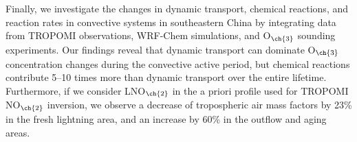 {Finally, we investigate the changes in dynamic transport, chemical reactions, and reaction rates in convective systems in southeastern China by integrating data from TROPOMI observations, WRF-Chem simulations, and O$_{\ch{3}}$ sounding experiments.
Our findings reveal that dynamic transport can dominate O$_{\ch{3}}$ concentration changes during the convective active period,
but chemical reactions contribute 5--10 times more than dynamic transport over the entire lifetime.
Furthermore, if we consider LNO$_{\ch{2}}$ in the a priori profile used for TROPOMI NO$_{\ch{2}}$ inversion, we observe a decrease of tropospheric air mass factors by 23\% in the fresh lightning area, and an increase by 60\% in the outflow and aging areas.
}
